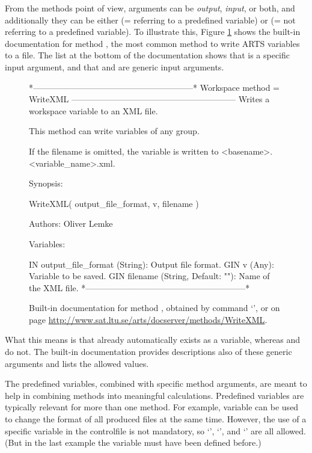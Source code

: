 From the methods point of view, arguments can be \emph{output},
\emph{input}, or both, and additionally they can be either
\emph{} (= referring to a predefined variable) or
\emph{} (= not referring to a predefined
variable). To illustrate this, Figure \ref{fig:WriteXML} shows the
built-in documentation for method , the most
common method to write ARTS variables to a file. The list at the
bottom of the documentation shows that
 is a specific input argument, and
that  and  are generic input
arguments.

\begin{figure}
\footnotesize
\begin{code}
*---------------------------------------------------------*
Workspace method = WriteXML
-----------------------------------------------------------
Writes a workspace variable to an XML file.

This method can write variables of any group.

If the filename is omitted, the variable is written
to <basename>.<variable_name>.xml.

Synopsis:

WriteXML( output_file_format, v, filename )

Authors: Oliver Lemke

Variables:

IN    output_file_format (String): Output file format.
GIN   v (Any): Variable to be saved.
GIN   filename (String, Default: ""): Name of the XML file.
*---------------------------------------------------------*
\end{code}
\caption{Built-in documentation for method , obtained by
  command `', or on page
  \url{http://www.sat.ltu.se/arts/docserver/methods/WriteXML}.}
\label{fig:WriteXML}
\end{figure}

What this means is that  already automatically
exists as a variable, whereas  and 
do not. The built-in documentation provides descriptions also of these generic
arguments and lists the allowed values.

The predefined variables, combined with specific method arguments, are meant to
help in combining methods into meaningful calculations. Predefined variables
are typically relevant for more than one method. For example, variable
 can be used to change the format of all produced
files at the same time. However, the use of a specific variable in the
controlfile is not mandatory, so `', `', and
`' are all allowed. (But in the
last example the variable  must have been defined before.)

